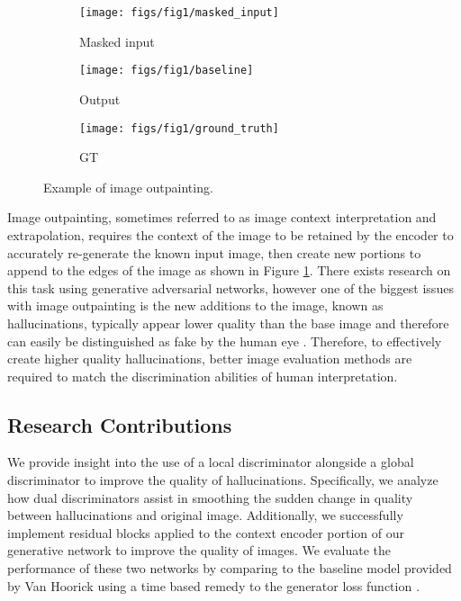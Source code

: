 \documentclass{article}
\begin{document}
\begin{figure}
	\captionsetup[subfigure]{labelformat=empty}
    \centering
    \begin{subfigure}[b]{0.15\textwidth}
        \texttt{[image: figs/fig1/masked\_input]}
        \caption{Masked input}
    \end{subfigure}
    \hfill
    \begin{subfigure}[b]{0.15\textwidth}
        \texttt{[image: figs/fig1/baseline]}
        \caption{Output}
    \end{subfigure}
    \hfill
    \begin{subfigure}[b]{0.15\textwidth}
        \texttt{[image: figs/fig1/ground\_truth]}
        \caption{GT}
    \end{subfigure}
  	\caption{Example of image outpainting.}
  	\label{fig:fig1}
\end{figure}

Image outpainting, sometimes referred to as image context interpretation and extrapolation, requires the context of the image to be retained by the encoder to accurately re-generate the known input image, then create new portions to append to the edges of the image as shown in Figure \ref{fig:fig1}. There exists research on this task using generative adversarial networks, however one of the biggest issues with image outpainting is the new additions to the image, known as hallucinations, typically appear lower quality than the base image and therefore can easily be distinguished as fake by the human eye \citep{sabini_painting_2018}. Therefore, to effectively create higher quality hallucinations, better image evaluation methods are required to match the discrimination abilities of human interpretation.

\subsection{Research Contributions}
We provide insight into the use of a local discriminator alongside a global discriminator to improve the quality of hallucinations. Specifically, we analyze how dual discriminators assist in smoothing the sudden change in quality between hallucinations and original image. Additionally, we successfully implement residual blocks applied to the context encoder portion of our generative network to improve the quality of images. We evaluate the performance of these two networks by comparing to the baseline model provided by Van Hoorick using a time based remedy to the generator loss function \citep{van_hoorick_image_2020}.
\end{document}
